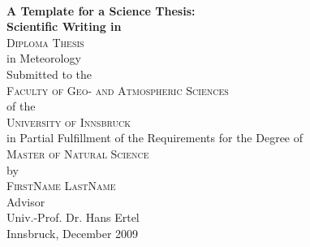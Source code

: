 \begin{titlepage}
\begin{center}

~\\[15mm]
{\Huge  {\bf A Template for a Science Thesis:}}\\[5mm]


{\LARGE {\bf Scientific Writing in \LaTeXe{}}}\\[15mm]


{\Large \textsc{Diploma Thesis}} \\[15mm]


{\large in Meteorology} \\[15mm]


{\large Submitted to the} \\[2mm]
{\Large \textsc{Faculty of Geo- and Atmospheric Sciences}} \\[2mm]
{\large of the} \\[2mm]
{\Large \textsc{University of Innsbruck}} \\[15mm]


{\large in Partial Fulfillment of the Requirements for the Degree of} \\[2mm]
{\Large \textsc{Master of Natural Science}} \\[15mm]


{\large by} \\[2mm]
{\Large \textsc{FirstName LastName}} \\[15mm]


{\large Advisor} \\[2mm]
{\large Univ.-Prof. Dr. Hans Ertel} \\[15mm]


{\large Innsbruck, December 2009}


\end{center}
\end{titlepage}
